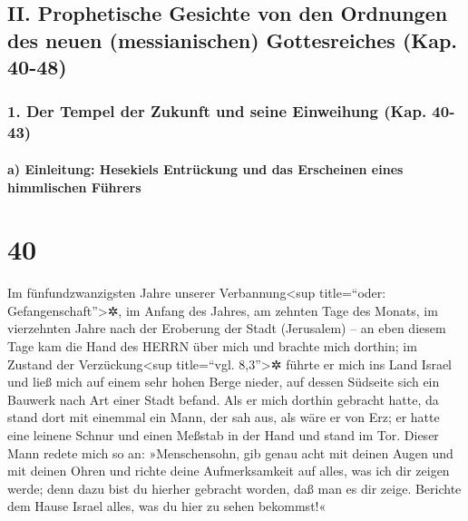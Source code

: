 \hypertarget{ii.-prophetische-gesichte-von-den-ordnungen-des-neuen-messianischen-gottesreiches-kap.-40-48}{%
\subsection{II. Prophetische Gesichte von den Ordnungen des neuen
(messianischen) Gottesreiches (Kap.
40-48)}\label{ii.-prophetische-gesichte-von-den-ordnungen-des-neuen-messianischen-gottesreiches-kap.-40-48}}

\hypertarget{der-tempel-der-zukunft-und-seine-einweihung-kap.-40-43}{%
\subsubsection{1. Der Tempel der Zukunft und seine Einweihung (Kap.
40-43)}\label{der-tempel-der-zukunft-und-seine-einweihung-kap.-40-43}}

\hypertarget{a-einleitung-hesekiels-entruxfcckung-und-das-erscheinen-eines-himmlischen-fuxfchrers}{%
\paragraph{a) Einleitung: Hesekiels Entrückung und das Erscheinen eines
himmlischen
Führers}\label{a-einleitung-hesekiels-entruxfcckung-und-das-erscheinen-eines-himmlischen-fuxfchrers}}

\hypertarget{section-39}{%
\section{40}\label{section-39}}

Im fünfundzwanzigsten Jahre unserer
Verbannung\textless sup title=``oder: Gefangenschaft''\textgreater✲, im
Anfang des Jahres, am zehnten Tage des Monats, im vierzehnten Jahre nach
der Eroberung der Stadt (Jerusalem) -- an eben diesem Tage kam die Hand
des HERRN über mich und brachte mich dorthin; im Zustand
der Verzückung\textless sup title=``vgl. 8,3''\textgreater✲ führte er
mich ins Land Israel und ließ mich auf einem sehr hohen Berge nieder,
auf dessen Südseite sich ein Bauwerk nach Art einer Stadt befand.
Als er mich dorthin gebracht hatte, da stand dort mit
einemmal ein Mann, der sah aus, als wäre er von Erz; er hatte eine
leinene Schnur und einen Meßstab in der Hand und stand im Tor.
Dieser Mann redete mich so an: »Menschensohn, gib genau
acht mit deinen Augen und mit deinen Ohren und richte deine
Aufmerksamkeit auf alles, was ich dir zeigen werde; denn dazu bist du
hierher gebracht worden, daß man es dir zeige. Berichte dem Hause Israel
alles, was du hier zu sehen bekommst!«

